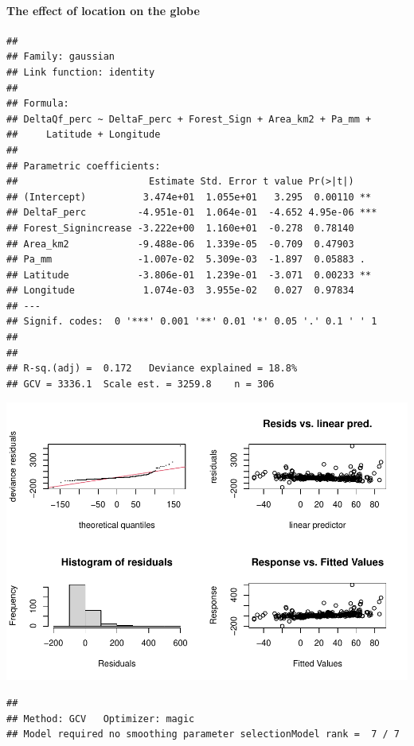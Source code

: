 \documentclass[]{elsarticle} %
\begin{document}
\hypertarget{the-effect-of-location-on-the-globe}{%
\paragraph{The effect of location on the
globe}\label{the-effect-of-location-on-the-globe}}

\begin{verbatim}
## 
## Family: gaussian 
## Link function: identity 
## 
## Formula:
## DeltaQf_perc ~ DeltaF_perc + Forest_Sign + Area_km2 + Pa_mm + 
##     Latitude + Longitude
## 
## Parametric coefficients:
##                       Estimate Std. Error t value Pr(>|t|)    
## (Intercept)          3.474e+01  1.055e+01   3.295  0.00110 ** 
## DeltaF_perc         -4.951e-01  1.064e-01  -4.652 4.95e-06 ***
## Forest_Signincrease -3.222e+00  1.160e+01  -0.278  0.78140    
## Area_km2            -9.488e-06  1.339e-05  -0.709  0.47903    
## Pa_mm               -1.007e-02  5.309e-03  -1.897  0.05883 .  
## Latitude            -3.806e-01  1.239e-01  -3.071  0.00233 ** 
## Longitude            1.074e-03  3.955e-02   0.027  0.97834    
## ---
## Signif. codes:  0 '***' 0.001 '**' 0.01 '*' 0.05 '.' 0.1 ' ' 1
## 
## 
## R-sq.(adj) =  0.172   Deviance explained = 18.8%
## GCV = 3336.1  Scale est. = 3259.8    n = 306
\end{verbatim}

\includegraphics{Forest_and_Water_files/figure-latex/model2a-1.pdf}

\begin{verbatim}
## 
## Method: GCV   Optimizer: magic
## Model required no smoothing parameter selectionModel rank =  7 / 7
\end{verbatim}
\end{document}
